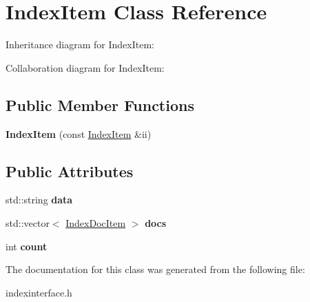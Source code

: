 \hypertarget{classIndexItem}{}\section{Index\+Item Class Reference}
\label{classIndexItem}


Inheritance diagram for Index\+Item\+:


Collaboration diagram for Index\+Item\+:
\subsection*{Public Member Functions}
\begin{DoxyCompactItemize}
\item 
{\bfseries Index\+Item} (const \hyperlink{classIndexItem}{Index\+Item} \&ii)\hypertarget{classIndexItem_ac89eef4f286fbc21878ee4c98c4e230c}{}\label{classIndexItem_ac89eef4f286fbc21878ee4c98c4e230c}

\end{DoxyCompactItemize}
\subsection*{Public Attributes}
\begin{DoxyCompactItemize}
\item 
std\+::string {\bfseries data}\hypertarget{classIndexItem_a013741314640f5786b34b0f3e177a711}{}\label{classIndexItem_a013741314640f5786b34b0f3e177a711}

\item 
std\+::vector$<$ \hyperlink{classIndexDocItem}{Index\+Doc\+Item} $>$ {\bfseries docs}\hypertarget{classIndexItem_a8f16fca95e03322a166cba7336d5f7b1}{}\label{classIndexItem_a8f16fca95e03322a166cba7336d5f7b1}

\item 
int {\bfseries count}\hypertarget{classIndexItem_acc0bf23e5d1dd5a8592d974f21429bfe}{}\label{classIndexItem_acc0bf23e5d1dd5a8592d974f21429bfe}

\end{DoxyCompactItemize}


The documentation for this class was generated from the following file\+:\begin{DoxyCompactItemize}
\item 
indexinterface.\+h\end{DoxyCompactItemize}
